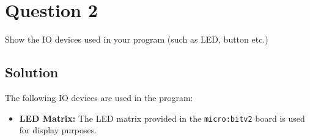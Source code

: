 \section*{Question 2}

Show the IO devices used in your program (such as LED, button etc.)

\subsection*{Solution}

The following IO devices are used in the program:
\begin{itemize}
    \item \textbf{LED Matrix:} The LED matrix provided in the \texttt{micro:bit\;v2} board is used for display purposes.
\end{itemize}
